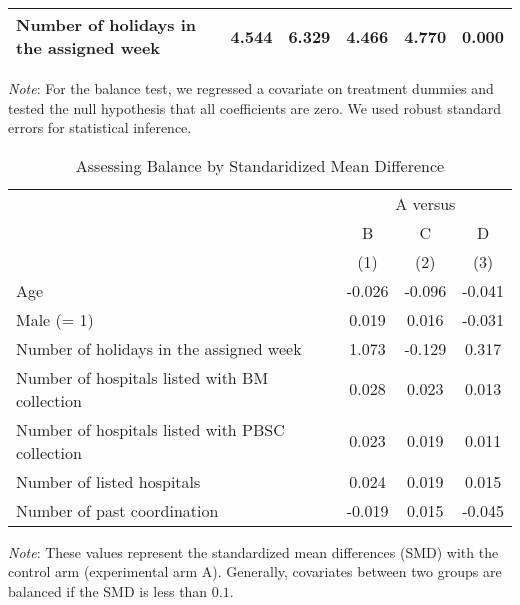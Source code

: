 \documentclass[12pt, a4paper]{article}
\begin{document}
\begin{table}[H]
\begin{threeparttable}
\begin{tabular}[t]{lccccc}
\hspace{1em}Number of holidays in the assigned week & 4.544 & 6.329 & 4.466 & 4.770 & 0.000\\
\bottomrule
\end{tabular}
\begin{tablenotes}
\item \emph{Note}: For the balance test, we regressed a covariate on treatment dummies and tested the null hypothesis that all coefficients are zero. We used robust standard errors for statistical inference.
\end{tablenotes}
\end{threeparttable}
\end{table}

\begin{table}[H]

\caption{\label{tab:smd-balance}Assessing Balance by Standaridized Mean Difference}
\centering
\fontsize{8}{10}\selectfont
\begin{threeparttable}
\begin{tabular}[t]{lccc}
\toprule
\multicolumn{1}{c}{ } & \multicolumn{3}{c}{A versus} \\
\cmidrule(l{3pt}r{3pt}){2-4}
\multicolumn{1}{c}{ } & \multicolumn{1}{c}{B} & \multicolumn{1}{c}{C} & \multicolumn{1}{c}{D} \\
\cmidrule(l{3pt}r{3pt}){2-2} \cmidrule(l{3pt}r{3pt}){3-3} \cmidrule(l{3pt}r{3pt}){4-4}
 & (1) & (2) & (3)\\
\midrule
Age & -0.026 & -0.096 & -0.041\\
Male (= 1) & 0.019 & 0.016 & -0.031\\
Number of holidays in the assigned week & 1.073 & -0.129 & 0.317\\
Number of hospitals listed with BM collection & 0.028 & 0.023 & 0.013\\
Number of hospitals listed with PBSC collection & 0.023 & 0.019 & 0.011\\
Number of listed hospitals & 0.024 & 0.019 & 0.015\\
Number of past coordination & -0.019 & 0.015 & -0.045\\
\bottomrule
\end{tabular}
\begin{tablenotes}
\item \emph{Note}: These values represent the standardized mean differences (SMD) with the control arm (experimental arm A). Generally, covariates between two groups are balanced if the SMD is less than $0.1$.
\end{tablenotes}
\end{threeparttable}
\end{table}
\end{document}
